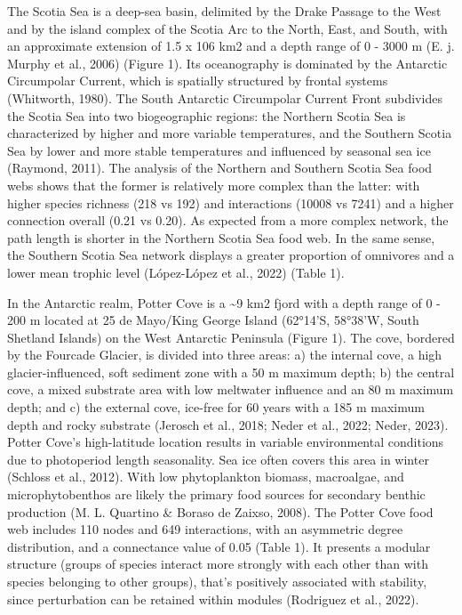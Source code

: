 \documentclass[
]{article}
\begin{document}
The Scotia Sea is a deep-sea basin, delimited by the Drake Passage to
the West and by the island complex of the Scotia Arc to the North, East,
and South, with an approximate extension of 1.5 x 106 km2 and a depth
range of 0 - 3000 m (E. j. Murphy et al., 2006) (Figure 1). Its
oceanography is dominated by the Antarctic Circumpolar Current, which is
spatially structured by frontal systems (Whitworth, 1980). The South
Antarctic Circumpolar Current Front subdivides the Scotia Sea into two
biogeographic regions: the Northern Scotia Sea is characterized by
higher and more variable temperatures, and the Southern Scotia Sea by
lower and more stable temperatures and influenced by seasonal sea ice
(Raymond, 2011). The analysis of the Northern and Southern Scotia Sea
food webs shows that the former is relatively more complex than the
latter: with higher species richness (218 vs 192) and interactions
(10008 vs 7241) and a higher connection overall (0.21 vs 0.20). As
expected from a more complex network, the path length is shorter in the
Northern Scotia Sea food web. In the same sense, the Southern Scotia Sea
network displays a greater proportion of omnivores and a lower mean
trophic level (López-López et al., 2022) (Table 1).

In the Antarctic realm, Potter Cove is a \textasciitilde9 km2 fjord with
a depth range of 0 - 200 m located at 25 de Mayo/King George Island
(62°14'S, 58°38'W, South Shetland Islands) on the West Antarctic
Peninsula (Figure 1). The cove, bordered by the Fourcade Glacier, is
divided into three areas: a) the internal cove, a high
glacier-influenced, soft sediment zone with a 50 m maximum depth; b) the
central cove, a mixed substrate area with low meltwater influence and an
80 m maximum depth; and c) the external cove, ice-free for 60 years with
a 185 m maximum depth and rocky substrate (Jerosch et al., 2018; Neder
et al., 2022; Neder, 2023). Potter Cove's high-latitude location results
in variable environmental conditions due to photoperiod length
seasonality. Sea ice often covers this area in winter (Schloss et al.,
2012). With low phytoplankton biomass, macroalgae, and microphytobenthos
are likely the primary food sources for secondary benthic production (M.
L. Quartino \& Boraso de Zaixso, 2008). The Potter Cove food web
includes 110 nodes and 649 interactions, with an asymmetric degree
distribution, and a connectance value of 0.05 (Table 1). It presents a
modular structure (groups of species interact more strongly with each
other than with species belonging to other groups), that's positively
associated with stability, since perturbation can be retained within
modules (Rodriguez et al., 2022).
\end{document}
